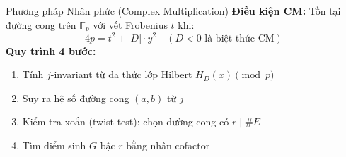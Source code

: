 \begin{frame}{Phương pháp Nhân phức (Complex Multiplication)}
  \textbf{Điều kiện CM:} Tồn tại đường cong trên $\mathbb{F}_p$ với vết Frobenius $t$ khi:
  \[
    4p = t^2 + |D| \cdot y^2 \quad (D < 0 \text{ là biệt thức CM})
  \]
  \vspace{0.3em}
  \textbf{Quy trình 4 bước:}
  \begin{enumerate}
    \item Tính $j$-invariant từ đa thức lớp Hilbert $H_D(x) \pmod{p}$
    \item Suy ra hệ số đường cong $(a, b)$ từ $j$
    \item Kiểm tra xoắn (twist test): chọn đường cong có $r \mid \#E$
    \item Tìm điểm sinh $G$ bậc $r$ bằng nhân cofactor
  \end{enumerate}
\end{frame}
